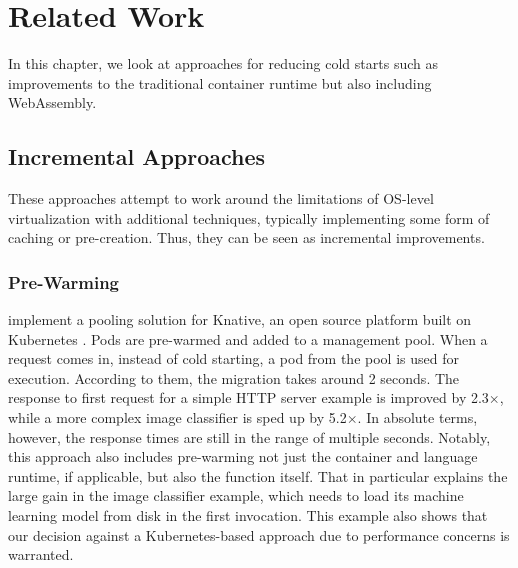 \chapter{Related Work}
\label{chapter:relatedwork}

In this chapter, we look at approaches for reducing cold starts such as improvements to the traditional container runtime but also including WebAssembly.

\section{Incremental Approaches}

These approaches attempt to work around the limitations of OS-level virtualization with additional techniques, typically implementing some form of caching or pre-creation. Thus, they can be seen as incremental improvements.

\subsection{Pre-Warming}

\citeauthor{Lin2019} implement a pooling solution for Knative, an open source platform built on Kubernetes \cite{Lin2019}. Pods are pre-warmed and added to a management pool. When a request comes in, instead of cold starting, a pod from the pool is used for execution. According to them, the migration takes around 2 seconds. The response to first request for a simple HTTP server example is improved by 2.3$\times$, while a more complex image classifier is sped up by 5.2$\times$. In absolute terms, however, the response times are still in the range of multiple seconds. Notably, this approach also includes pre-warming not just the container and language runtime, if applicable, but also the function itself. That in particular explains the large gain in the image classifier example, which needs to load its machine learning model from disk in the first invocation. This example also shows that our decision against a Kubernetes-based approach due to performance concerns is warranted.

